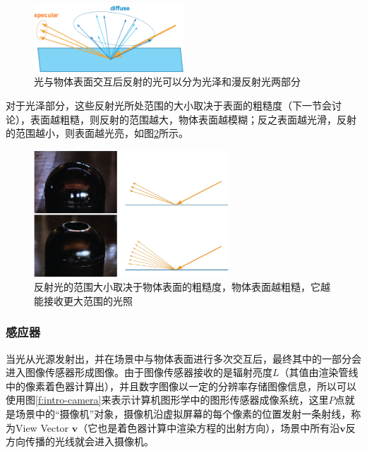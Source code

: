 \begin{figure}
\sidecaption
	\includegraphics[width=0.5\textwidth]{figures/intro/ray-optics-6}
	\caption{光与物体表面交互后反射的光可以分为光泽和漫反射光两部分}
	\label{f:intro-specular-and-diffuse}
\end{figure}

对于光泽部分，这些反射光所处范围的大小取决于表面的粗糙度（下一节会讨论），表面越粗糙，则反射的范围越大，物体表面越模糊；反之表面越光滑，反射的范围越小，则表面越光亮，如图\ref{f:intro-roughness}所示。

\begin{figure}
\sidecaption
	\includegraphics[width=0.65\textwidth]{figures/intro/ray-optics-2}
	\caption{反射光的范围大小取决于物体表面的粗糙度，物体表面越粗糙，它越能接收更大范围的光照}
	\label{f:intro-roughness}
\end{figure}




\subsubsection{感应器}\label{sec:intro-sensor}
当光从光源发射出，并在场景中与物体表面进行多次交互后，最终其中的一部分会进入图像传感器形成图像。由于图像传感器接收的是辐射亮度$L$（其值由渲染管线中的像素着色器计算出），并且数字图像以一定的分辨率存储图像信息，所以可以使用图\ref{f:intro-camera}来表示计算机图形学中的图形传感器成像系统，这里$P$点就是场景中的“摄像机”对象，摄像机沿虚拟屏幕的每个像素的位置发射一条射线，称为View Vector $\mathbf{v}$（它也是着色器计算中渲染方程的出射方向），场景中所有沿$\mathbf{v}$反方向传播的光线就会进入摄像机。

